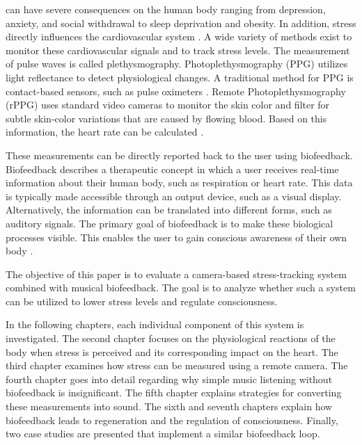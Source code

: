 
 can have severe consequences on the human body ranging from depression, anxiety, and social withdrawal to sleep deprivation and obesity. In addition, stress directly influences the cardiovascular system \cite{mcewen2017neurobiology}. A wide variety of methods exist to monitor these cardiovascular signals and to track stress levels. The measurement of pulse waves is called plethysmography. Photoplethysmography (PPG) utilizes light reflectance to detect physiological changes. A traditional method for PPG is contact-based sensors, such as pulse oximeters \cite{verkruysse2008remote}. Remote Photoplethysmography (rPPG) uses standard video cameras to monitor the skin color and filter for subtle skin-color variations that are caused by flowing blood. Based on this information, the heart rate can be calculated \cite{verkruysse2008remote}.

These measurements can be directly reported back to the user using biofeedback. Biofeedback describes a therapeutic concept in which a user receives real-time information about their human body, such as respiration or heart rate. This data is typically made accessible through an output device, such as a visual display. Alternatively, the information can be translated into different forms, such as auditory signals. The primary goal of biofeedback is to make these biological processes visible. This enables the user to gain conscious awareness of their own body \cite{giggins2013biofeedback}.

The objective of this paper is to evaluate a camera-based stress-tracking system combined with musical biofeedback. The goal is to analyze whether such a system can be utilized to lower stress levels and regulate consciousness.

In the following chapters, each individual component of this system is investigated. The second chapter focuses on the physiological reactions of the body when stress is perceived and its corresponding impact on the heart. The third chapter examines how stress can be measured using a remote camera. The fourth chapter goes into detail regarding why simple music listening without biofeedback is insignificant. The fifth chapter explains strategies for converting these measurements into sound. The sixth and seventh chapters explain how biofeedback leads to regeneration and the regulation of consciousness. Finally, two case studies are presented that implement a similar biofeedback loop.